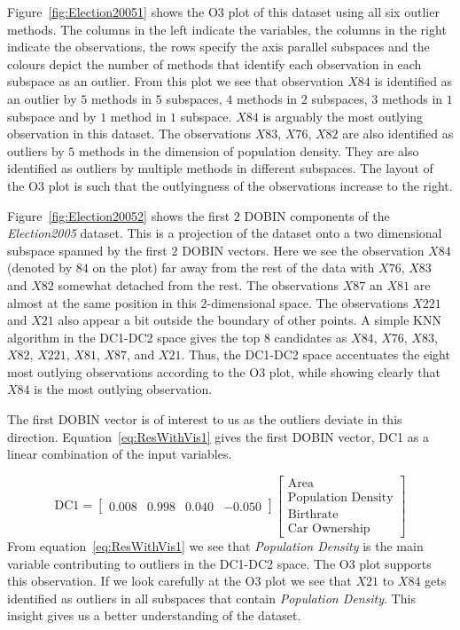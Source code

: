 \documentclass[a4paper,11pt]{article}
\begin{document}
Figure~\ref{fig:Election20051} shows the O3 plot of this dataset using all six outlier methods. The columns in the left indicate the variables, the columns in the right indicate the observations, the rows specify the axis parallel subspaces and the colours depict the number of methods that identify each observation in each subspace as an outlier. From this plot we see that observation $X84$ is identified as an outlier by $5$ methods in $5$ subspaces, $4$ methods in $2$ subspaces, $3$ methods in $1$ subspace and by $1$ method in $1$ subspace. $X84$ is arguably the most outlying observation in this dataset. The observations $X83$, $X76$, $X82$ are also identified as outliers by $5$ methods in the dimension of population density. They are also identified as outliers by multiple methods in different subspaces. The layout of the O3 plot is such that the outlyingness of the observations increase to the right.

Figure~\ref{fig:Election20052} shows the first $2$ DOBIN components of the \textit{Election2005} dataset. This is a projection of the dataset onto a two dimensional subspace spanned by the first $2$ DOBIN vectors. Here we see the observation $X84$ (denoted by $84$ on the plot) far away from the rest of the data with $X76$, $X83$ and $X82$ somewhat detached from the rest. The observations $X87$ an $X81$ are almost at the same position in this $2$-dimensional space. The observations $X221$ and $X21$ also appear a bit outside the boundary of  other points. A simple KNN algorithm in the DC1-DC2 space gives the top $8$ candidates as $X84$, $X76$,  $X83$, $X82$, $X221$, $X81$, $X87$, and  $X21$. Thus, the DC1-DC2 space accentuates the eight most outlying observations according to the O3 plot, while showing clearly that $X84$ is the most outlying observation.

The first DOBIN vector is of interest to us as the outliers deviate in this direction. Equation~\eqref{eq:ResWithVis1} gives the first DOBIN vector,   DC1 as a linear combination of the input variables.

\begin{equation}\label{eq:ResWithVis1}
    \text{DC1} = \begin{bmatrix}
    0.008 & 0.998 & 0.040 & -0.050
    \end{bmatrix}
    \begin{bmatrix}
    \text{Area} \\
    \text{Population Density} \\
    \text{Birthrate} \\
    \text{Car Ownership}
    \end{bmatrix}
\end{equation}
From equation~\eqref{eq:ResWithVis1} we see that \textit{Population Density} is the main variable contributing to outliers in the DC1-DC2 space. The O3 plot supports this observation. If we look carefully at the O3 plot we see that $X21$ to $X84$ gets identified as outliers in  all subspaces that contain \textit{Population Density}.  This insight gives us a better understanding of the dataset.
\end{document}
